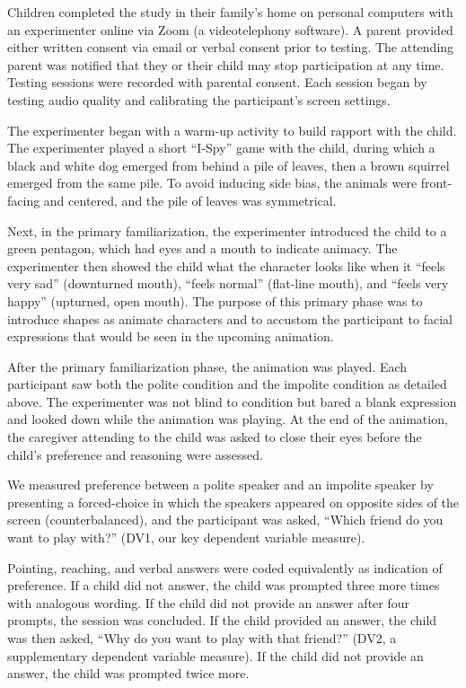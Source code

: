 \documentclass[
  english,
  man,floatsintext]{apa6}
\begin{document}
Children completed the study in their family's home on personal computers with an experimenter online via Zoom (a videotelephony software). A parent provided either written consent via email or verbal consent prior to testing. The attending parent was notified that they or their child may stop participation at any time. Testing sessions were recorded with parental consent. Each session began by testing audio quality and calibrating the participant's screen settings.

The experimenter began with a warm-up activity to build rapport with the child. The experimenter played a short ``I-Spy'' game with the child, during which a black and white dog emerged from behind a pile of leaves, then a brown squirrel emerged from the same pile. To avoid inducing side bias, the animals were front-facing and centered, and the pile of leaves was symmetrical.

Next, in the primary familiarization, the experimenter introduced the child to a green pentagon, which had eyes and a mouth to indicate animacy. The experimenter then showed the child what the character looks like when it ``feels very sad'' (downturned mouth), ``feels normal'' (flat-line mouth), and ``feels very happy'' (upturned, open mouth). The purpose of this primary phase was to introduce shapes as animate characters and to accustom the participant to facial expressions that would be seen in the upcoming animation.

After the primary familiarization phase, the animation was played. Each participant saw both the polite condition and the impolite condition as detailed above. The experimenter was not blind to condition but bared a blank expression and looked down while the animation was playing. At the end of the animation, the caregiver attending to the child was asked to close their eyes before the child's preference and reasoning were assessed.

We measured preference between a polite speaker and an impolite speaker by presenting a forced-choice in which the speakers appeared on opposite sides of the screen (counterbalanced), and the participant was asked, ``Which friend do you want to play with?'' (DV1, our key dependent variable measure).

Pointing, reaching, and verbal answers were coded equivalently as indication of preference. If a child did not answer, the child was prompted three more times with analogous wording. If the child did not provide an answer after four prompts, the session was concluded. If the child provided an answer, the child was then asked, ``Why do you want to play with that friend?'' (DV2, a supplementary dependent variable measure). If the child did not provide an answer, the child was prompted twice more.
\end{document}

